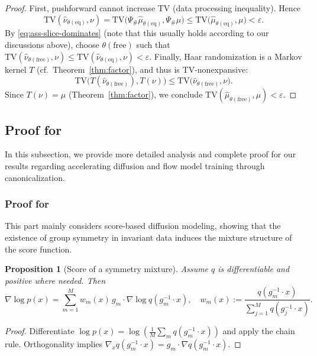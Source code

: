 \documentclass{article}
\theoremstyle{plain}
\newtheorem{proposition}[theorem]{Proposition}
\theoremstyle{definition}
\theoremstyle{remark}
\newcommand{\1}{\mathbf{1}}
\newcommand{\TV}{\mathrm{TV}}
\newcommand{\grad}{\nabla}
\newcommand{\acts}{\cdot} %
\begin{document}
\begin{proof}
First, pushforward cannot increase TV (data processing inequality). Hence
\begin{equation}
\TV(\hat\nu_{\theta(\mathrm{eq})},\nu)
=\TV\big(\Psi_{\#}\hat\mu_{\theta(\mathrm{eq})},\Psi_{\#}\mu\big)
\le \TV\big(\hat\mu_{\theta(\mathrm{eq})},\mu\big)
<\varepsilon.
\end{equation}
By \eqref{eq:ass-slice-dominates} (note that this usually holds according to our discussions above), choose $\theta(\mathrm{free})$ such that $\TV(\hat\nu_{\theta(\mathrm{free})},\nu)\le\TV(\hat\nu_{\theta(\mathrm{eq})},\nu)<\varepsilon$.
Finally, Haar randomization is a Markov kernel $T$ (cf.\ Theorem~\ref{thm:factor}), and thus is TV-nonexpansive:
\begin{equation}
\TV\big(T(\hat\nu_{\theta(\mathrm{free})}),T(\nu)\big)\le \TV\big(\hat\nu_{\theta(\mathrm{free})},\nu\big).
\end{equation}
Since $T(\nu)=\mu$ (Theorem~\ref{thm:factor}), we conclude $\TV(\hat\mu_{\theta(\mathrm{free})},\mu)<\varepsilon$. \qedhere
\end{proof}

\subsection{Proof for }\label{subsec_appendix:proof_accelerate}
In this subsection, we provide more detailed analysis and complete proof for our results regarding accelerating diffusion and flow model training through canonicalization.

\subsubsection{Proof for }
This part mainly considers score-based diffusion modeling, showing that the existence of group symmetry in invariant data induces the mixture structure of the score function.
\begin{proposition}[Score of a symmetry mixture]\label{prop:mixture-score}
Assume $q$ is differentiable and positive where needed. Then
\begin{equation}
\grad \log p(x)=\sum_{m=1}^M w_m(x)\, g_m\acts \grad \log q(g_m^{-1}\acts x),
\quad
w_m(x):=\frac{q(g_m^{-1}\acts x)}{\sum_{j=1}^M q(g_j^{-1}\acts x)}.
\end{equation}
\end{proposition}
\begin{proof}
Differentiate $\log p(x)=\log\left(\frac{1}{M}\sum_m q(g_m^{-1}\acts x)\right)$ and apply the chain rule. Orthogonality implies $\grad_x q(g_m^{-1}\acts x)=g_m\acts \grad q(g_m^{-1}\acts x)$. \qedhere
\end{proof}
\end{document}
